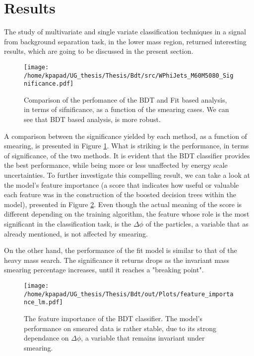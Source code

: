 \newpage
\section{Results}
\label{sec:org7065c84}
The study of multivariate and single variate classification techniques in a signal from background separation task, in the lower mass region, returned interesting results, which are going to be discussed in the present section. 
\begin{figure}[h]
\centering
\texttt{[image: /home/kpapad/UG\_thesis/Thesis/Bdt/src/WPhiJets\_M60M5080\_Significance.pdf]}
\caption{ Comparison of the perfomance of the BDT and Fit based analysis, in terms of sifnificance,  as a function of the smearing cases. We can see that BDT based analysis, is more robust.}
\label{fig:LightBdtFitSig}
\end{figure}

A comparison between the significance yielded by each method, as a function of smearing, is presented in Figure \ref{fig:LightBdtFitSig}. What is striking is the performance, in terms of significance, of the two methods. It is evident that the BDT classifier provides the best performance, while being more or less unaffected by energy scale uncertainties. To further investigate this compelling result, we can take a look at the model's feature importance (a score that indicates how useful or valuable each feature was in the construction of the boosted decision trees within the model), presented in Figure \ref{fig:LightFeatureImportance}. Even though the actual meaning of the score is different depending on the training algorithm, the feature whose role is the most significant in the classification task, is the \(\Delta\phi\) of the particles, a variable that as already mentioned, is not affected by smearing.

On the other hand, the performance of the fit model is similar to that of the heavy mass search. The significance it returns drops as the invariant mass smearing percentage increases, until it reaches a "breaking point".
\begin{figure}[h!]
\centering
\texttt{[image: /home/kpapad/UG\_thesis/Thesis/Bdt/out/Plots/feature\_importance\_lm.pdf]}
\caption{The feature importance of the BDT classifier. The model's performance on smeared data is rather stable, due to its strong dependance on $\Delta\phi$, a variable that remains invariant under smearing. }
\label{fig:LightFeatureImportance}
\end{figure}

